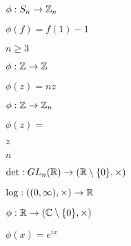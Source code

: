 \documentclass[10pt]{book}
\begin{document}
\begin{mdSnippets}
\begin{mdInlineSnippet}[f44c81f8954c6618be4848a6cdd0fb3e]
$\phi: S_n \to \mathbb{Z}_n$\end{mdInlineSnippet}%
\begin{mdInlineSnippet}[5ab21b0ad01b86737fadee1b442f0b73]%
$\phi(f) = f(1) - 1$\end{mdInlineSnippet}%
\begin{mdInlineSnippet}[b22e53f4844ad42cba603e3f5517437b]%
$n \ge 3$\end{mdInlineSnippet}%
\begin{mdInlineSnippet}[d23b12693cf4c49491604e65164e7613]%
$\phi: \mathbb{Z} \to \mathbb{Z}$\end{mdInlineSnippet}%
\begin{mdInlineSnippet}%
$\phi(z) = nz$\end{mdInlineSnippet}%
\begin{mdInlineSnippet}%
$\phi: \mathbb{Z} \to \mathbb{Z}_n$\end{mdInlineSnippet}%
\begin{mdInlineSnippet}[254b342304b0f578cdb0fd36b885bf76]%
$\phi(z) =$\end{mdInlineSnippet}%
\begin{mdInlineSnippet}[fbade9e36a3f36d3d676c1b808451dd7]%
$z$\end{mdInlineSnippet}%
\begin{mdInlineSnippet}[7b8b965ad4bca0e41ab51de7b31363a1]%
$n$\end{mdInlineSnippet}%
\begin{mdInlineSnippet}[aa54911829937e0f352976ae6c7d6e0a]%
$\det: GL_n(\mathbb{R}) \to (\mathbb{R} \setminus \{0\}, \times)$\end{mdInlineSnippet}%
\begin{mdInlineSnippet}%
$\log: ((0, \infty), \times) \to \mathbb{R}$\end{mdInlineSnippet}%
\begin{mdInlineSnippet}[f1326b1f9ce58df651b6e1c5b86b8d0a]%
$\phi: \mathbb{R} \to (\mathbb{C} \setminus \{0\}, \times)$\end{mdInlineSnippet}%
\begin{mdInlineSnippet}[84d33b525e02ee09f215c2271e638477]%
$\phi(x) = e^{ix}$\end{mdInlineSnippet}%

\end{mdSnippets}
\end{document}
